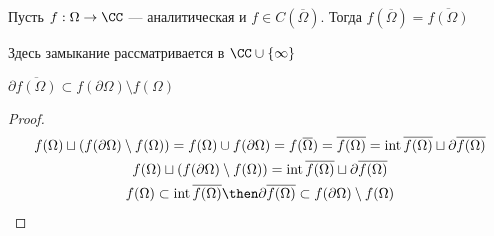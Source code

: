 \begin{claim}
    Пусть $f: \Omega \to \CC$ --- аналитическая и $f \in C(\overline{\Omega})$. Тогда $f(\overline{\Omega}) = \overline{f(\Omega)}$

    Здесь замыкание рассматривается в $\CC \cup \{\infty\}$
\end{claim}

\begin{crly}
    $\partial \overline{f(\Omega)} \subset f(\partial \Omega) \setminus f(\Omega)$
\end{crly}
\begin{proof}
    \begin{gather*} 
        f(\Omega) \sqcup \left( f(\partial \Omega) \setminus f(\Omega) \right) = f(\Omega) \cup f(\partial \Omega) = f(\overline{\Omega}) = \overline{f(\Omega)} = \operatorname*{int} \overline{f(\Omega)} \sqcup \partial \overline{f(\Omega)} \\ 
        f(\Omega) \sqcup \left( f(\partial \Omega) \setminus f(\Omega) \right) = \operatorname*{int} \overline{f(\Omega)} \sqcup \partial \overline{f(\Omega)}\\ 
        f(\Omega) \subset \operatorname{int}\overline{f(\Omega)} \then \partial \overline{f(\Omega)} \subset f(\partial \Omega) \setminus f(\Omega)
    \end{gather*}
\end{proof}

